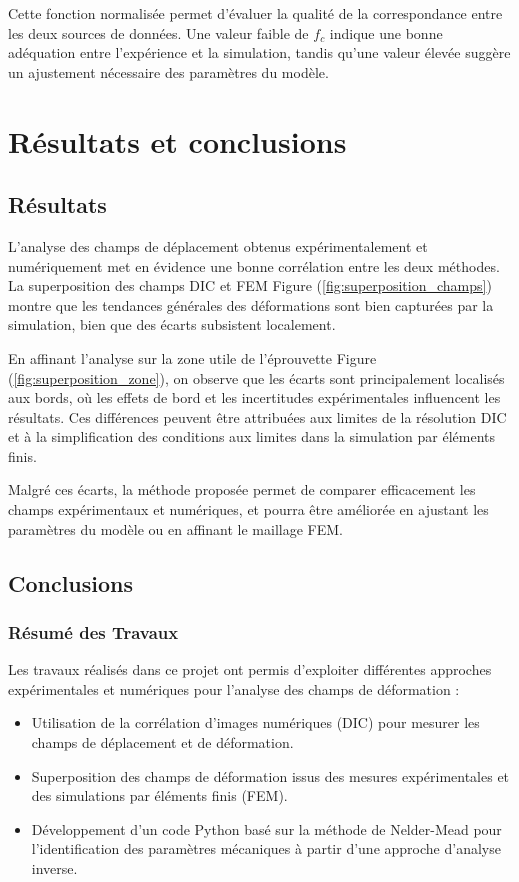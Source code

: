 \documentclass[12pt,a4paper]{article}
\begin{document}
Cette fonction normalisée permet d’évaluer la qualité de la correspondance entre les deux sources de données. Une valeur faible de $f_c$ indique une bonne adéquation entre l'expérience et la simulation, tandis qu'une valeur élevée suggère un ajustement nécessaire des paramètres du modèle.


\section{Résultats et conclusions}
\subsection{Résultats}
L'analyse des champs de déplacement obtenus expérimentalement et numériquement met en évidence une bonne corrélation entre les deux méthodes. La superposition des champs DIC et FEM Figure (\ref{fig:superposition_champs}) montre que les tendances générales des déformations sont bien capturées par la simulation, bien que des écarts subsistent localement.

En affinant l'analyse sur la zone utile de l'éprouvette Figure (\ref{fig:superposition_zone}), on observe que les écarts sont principalement localisés aux bords, où les effets de bord et les incertitudes expérimentales influencent les résultats. Ces différences peuvent être attribuées aux limites de la résolution DIC et à la simplification des conditions aux limites dans la simulation par éléments finis.

Malgré ces écarts, la méthode proposée permet de comparer efficacement les champs expérimentaux et numériques, et pourra être améliorée en ajustant les paramètres du modèle ou en affinant le maillage FEM.


\subsection{Conclusions}

\subsubsection{Résumé des Travaux}
Les travaux réalisés dans ce projet ont permis d'exploiter différentes approches expérimentales et numériques pour l'analyse des champs de déformation :

\begin{itemize}
    \item Utilisation de la corrélation d'images numériques (DIC) pour mesurer les champs de déplacement et de déformation.
    \item Superposition des champs de déformation issus des mesures expérimentales et des simulations par éléments finis (FEM).
    \item Développement d'un code Python basé sur la méthode de Nelder-Mead pour l'identification des paramètres mécaniques à partir d'une approche d'analyse inverse.
\end{itemize}
\end{document}
